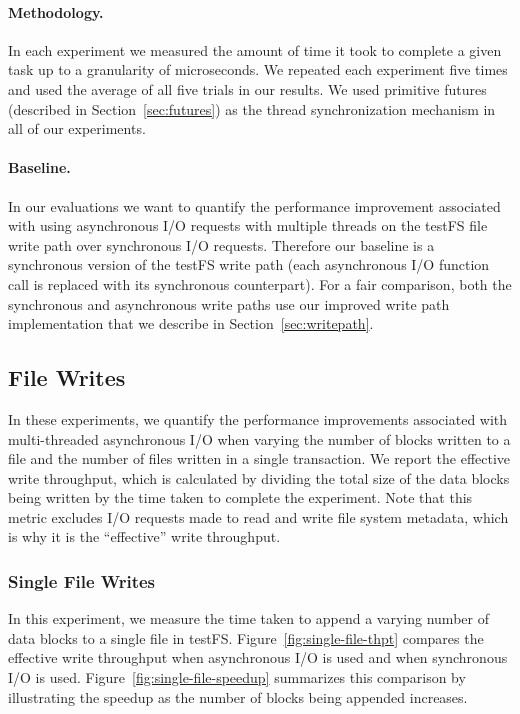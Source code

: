 \paragraph{Methodology.}
In each experiment we measured the amount of time it took to complete a given
task up to a granularity of microseconds. We repeated each experiment five
times and used the average of all five trials in our results. We used primitive
futures (described in Section~\ref{sec:futures}) as the thread synchronization
mechanism in all of our experiments.

\paragraph{Baseline.}
In our evaluations we want to quantify the performance improvement associated
with using asynchronous I/O requests with multiple threads on the testFS file
write path over synchronous I/O requests. Therefore our baseline is a
synchronous version of the testFS write path (each asynchronous I/O function
call is replaced with its synchronous counterpart). For a fair comparison, both
the synchronous and asynchronous write paths use our improved write path
implementation that we describe in Section~\ref{sec:writepath}.

\subsection{File Writes}
In these experiments, we quantify the performance improvements associated with
multi-threaded asynchronous I/O when varying the number of blocks written to a
file and the number of files written in a single transaction. We report the
effective write throughput, which is calculated by dividing the total size of
the data blocks being written by the time taken to complete the experiment.
Note that this metric excludes I/O requests made to read and write file system
metadata, which is why it is the ``effective'' write throughput.

\subsubsection{Single File Writes}
In this experiment, we measure the time taken to append a varying number of
data blocks to a single file in testFS. Figure~\ref{fig:single-file-thpt}
compares the effective write throughput when asynchronous I/O is used and when
synchronous I/O is used. Figure~\ref{fig:single-file-speedup} summarizes this
comparison by illustrating the speedup as the number of blocks being appended
increases.


